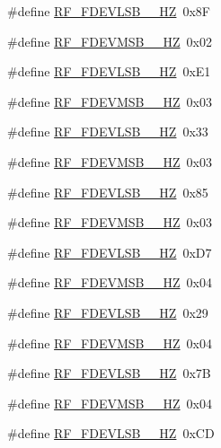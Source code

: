 \begin{DoxyCompactItemize}
\item 
\#define \hyperlink{sx1276Regs-Fsk_8h_a635b9754fb64e7fa3d62a0eb3a00e086}{R\+F\+\_\+\+F\+D\+E\+V\+L\+S\+B\+\_\+\_\+\+HZ}~0x8F
\item 
\#define \hyperlink{sx1276Regs-Fsk_8h_a5e36011fe2f0d8bee1bd3aa9a928c18c}{R\+F\+\_\+\+F\+D\+E\+V\+M\+S\+B\+\_\+\_\+\+HZ}~0x02
\item 
\#define \hyperlink{sx1276Regs-Fsk_8h_a8e69ee5a2729700dda58111180fae357}{R\+F\+\_\+\+F\+D\+E\+V\+L\+S\+B\+\_\+\_\+\+HZ}~0x\+E1
\item 
\#define \hyperlink{sx1276Regs-Fsk_8h_a2d77a912cc45a97d9fffaeafa791b186}{R\+F\+\_\+\+F\+D\+E\+V\+M\+S\+B\+\_\+\_\+\+HZ}~0x03
\item 
\#define \hyperlink{sx1276Regs-Fsk_8h_a1675346ade9c8f671aac79a317512699}{R\+F\+\_\+\+F\+D\+E\+V\+L\+S\+B\+\_\+\_\+\+HZ}~0x33
\item 
\#define \hyperlink{sx1276Regs-Fsk_8h_a2727b4b04f0a27d9f370c8f2b47e81fb}{R\+F\+\_\+\+F\+D\+E\+V\+M\+S\+B\+\_\+\_\+\+HZ}~0x03
\item 
\#define \hyperlink{sx1276Regs-Fsk_8h_a01b1b43aab91e76e84d00af78699ceba}{R\+F\+\_\+\+F\+D\+E\+V\+L\+S\+B\+\_\+\_\+\+HZ}~0x85
\item 
\#define \hyperlink{sx1276Regs-Fsk_8h_a0ca702dda690369e62b5225d3e5425e8}{R\+F\+\_\+\+F\+D\+E\+V\+M\+S\+B\+\_\+\_\+\+HZ}~0x03
\item 
\#define \hyperlink{sx1276Regs-Fsk_8h_ab739890a1c4948ba9df80139f9e90c66}{R\+F\+\_\+\+F\+D\+E\+V\+L\+S\+B\+\_\+\_\+\+HZ}~0x\+D7
\item 
\#define \hyperlink{sx1276Regs-Fsk_8h_a1d9bb9563e152c76f7cbb9df5e1b36c4}{R\+F\+\_\+\+F\+D\+E\+V\+M\+S\+B\+\_\+\_\+\+HZ}~0x04
\item 
\#define \hyperlink{sx1276Regs-Fsk_8h_a8036d3d91106128102f59ddecacd4dc3}{R\+F\+\_\+\+F\+D\+E\+V\+L\+S\+B\+\_\+\_\+\+HZ}~0x29
\item 
\#define \hyperlink{sx1276Regs-Fsk_8h_a3e130dcdc84aa5685b7bc35edf6027f2}{R\+F\+\_\+\+F\+D\+E\+V\+M\+S\+B\+\_\+\_\+\+HZ}~0x04
\item 
\#define \hyperlink{sx1276Regs-Fsk_8h_af2c378fd0b423a7ab42424b045402936}{R\+F\+\_\+\+F\+D\+E\+V\+L\+S\+B\+\_\+\_\+\+HZ}~0x7B
\item 
\#define \hyperlink{sx1276Regs-Fsk_8h_a95625bf09af0cd2a50f00f182a14746d}{R\+F\+\_\+\+F\+D\+E\+V\+M\+S\+B\+\_\+\_\+\+HZ}~0x04
\item 
\#define \hyperlink{sx1276Regs-Fsk_8h_a556565ac523c78650661dce1450dcaf7}{R\+F\+\_\+\+F\+D\+E\+V\+L\+S\+B\+\_\+\_\+\+HZ}~0x\+CD

\end{DoxyCompactItemize}
